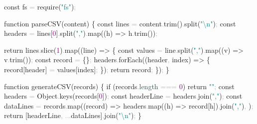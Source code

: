 \documentclass[
  justified,
  openright,
]{tufte-book}
\newcommand{\AttributeTok}[1]{\textcolor{DarkSlateGray}{#1}}
\newcommand{\BuiltInTok}[1]{#1}
\newcommand{\ControlFlowTok}[1]{\textcolor{BrandBlue}{#1}}
\newcommand{\DecValTok}[1]{\textcolor{Purple}{#1}}
\newcommand{\FunctionTok}[1]{\textcolor{BrandBlue}{#1}}
\newcommand{\KeywordTok}[1]{\textcolor{BrandBlue}{#1}}
\newcommand{\NormalTok}[1]{#1}
\newcommand{\OperatorTok}[1]{\textcolor{DarkGray}{#1}}
\newcommand{\PreprocessorTok}[1]{\textcolor{BrandAccent}{#1}}
\newcommand{\SpecialCharTok}[1]{\textcolor{Teal}{#1}}
\newcommand{\StringTok}[1]{\textcolor{Teal}{#1}}
\newenvironment{Shaded}{%
  \begin{snugshade}
}{%
  \end{snugshade}
}
\begin{document}
\begin{Shaded}
\begin{Highlighting}[]
\KeywordTok{const}\NormalTok{ fs }\OperatorTok{=} \PreprocessorTok{require}\NormalTok{(}\StringTok{"fs"}\NormalTok{)}\OperatorTok{;}

\KeywordTok{function} \FunctionTok{parseCSV}\NormalTok{(content) \{}
  \KeywordTok{const}\NormalTok{ lines }\OperatorTok{=}\NormalTok{ content}\OperatorTok{.}\FunctionTok{trim}\NormalTok{()}\OperatorTok{.}\FunctionTok{split}\NormalTok{(}\StringTok{"}\SpecialCharTok{\textbackslash{}n}\StringTok{"}\NormalTok{)}\OperatorTok{;}
  \KeywordTok{const}\NormalTok{ headers }\OperatorTok{=}\NormalTok{ lines[}\DecValTok{0}\NormalTok{]}\OperatorTok{.}\FunctionTok{split}\NormalTok{(}\StringTok{","}\NormalTok{)}\OperatorTok{.}\FunctionTok{map}\NormalTok{((h) }\KeywordTok{=\textgreater{}}\NormalTok{ h}\OperatorTok{.}\FunctionTok{trim}\NormalTok{())}\OperatorTok{;}

  \ControlFlowTok{return}\NormalTok{ lines}\OperatorTok{.}\FunctionTok{slice}\NormalTok{(}\DecValTok{1}\NormalTok{)}\OperatorTok{.}\FunctionTok{map}\NormalTok{((line) }\KeywordTok{=\textgreater{}}\NormalTok{ \{}
    \KeywordTok{const}\NormalTok{ values }\OperatorTok{=}\NormalTok{ line}\OperatorTok{.}\FunctionTok{split}\NormalTok{(}\StringTok{","}\NormalTok{)}\OperatorTok{.}\FunctionTok{map}\NormalTok{((v) }\KeywordTok{=\textgreater{}}\NormalTok{ v}\OperatorTok{.}\FunctionTok{trim}\NormalTok{())}\OperatorTok{;}
    \KeywordTok{const}\NormalTok{ record }\OperatorTok{=}\NormalTok{ \{\}}\OperatorTok{;}
\NormalTok{    headers}\OperatorTok{.}\FunctionTok{forEach}\NormalTok{((header}\OperatorTok{,}\NormalTok{ index) }\KeywordTok{=\textgreater{}}\NormalTok{ \{}
\NormalTok{      record[header] }\OperatorTok{=}\NormalTok{ values[index]}\OperatorTok{;}
\NormalTok{    \})}\OperatorTok{;}
    \ControlFlowTok{return}\NormalTok{ record}\OperatorTok{;}
\NormalTok{  \})}\OperatorTok{;}
\NormalTok{\}}

\KeywordTok{function} \FunctionTok{generateCSV}\NormalTok{(records) \{}
  \ControlFlowTok{if}\NormalTok{ (records}\OperatorTok{.}\AttributeTok{length} \OperatorTok{===} \DecValTok{0}\NormalTok{) }\ControlFlowTok{return} \StringTok{""}\OperatorTok{;}
  \KeywordTok{const}\NormalTok{ headers }\OperatorTok{=} \BuiltInTok{Object}\OperatorTok{.}\FunctionTok{keys}\NormalTok{(records[}\DecValTok{0}\NormalTok{])}\OperatorTok{;}
  \KeywordTok{const}\NormalTok{ headerLine }\OperatorTok{=}\NormalTok{ headers}\OperatorTok{.}\FunctionTok{join}\NormalTok{(}\StringTok{","}\NormalTok{)}\OperatorTok{;}
  \KeywordTok{const}\NormalTok{ dataLines }\OperatorTok{=}\NormalTok{ records}\OperatorTok{.}\FunctionTok{map}\NormalTok{((record) }\KeywordTok{=\textgreater{}}
\NormalTok{    headers}\OperatorTok{.}\FunctionTok{map}\NormalTok{((h) }\KeywordTok{=\textgreater{}}\NormalTok{ record[h])}\OperatorTok{.}\FunctionTok{join}\NormalTok{(}\StringTok{","}\NormalTok{)}\OperatorTok{,}
\NormalTok{  )}\OperatorTok{;}
  \ControlFlowTok{return}\NormalTok{ [headerLine}\OperatorTok{,} \OperatorTok{...}\NormalTok{dataLines]}\OperatorTok{.}\FunctionTok{join}\NormalTok{(}\StringTok{"}\SpecialCharTok{\textbackslash{}n}\StringTok{"}\NormalTok{)}\OperatorTok{;}
\NormalTok{\}}


\end{Highlighting}
\end{Shaded}
\end{document}
